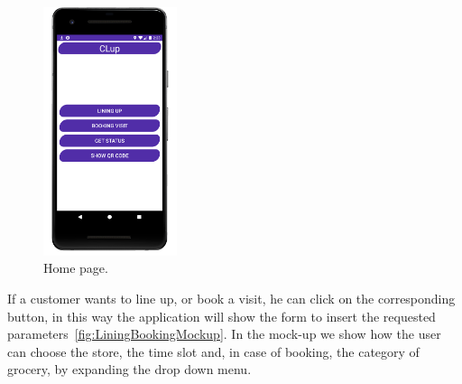 \begin{figure}[H]
	\centering
	\includegraphics[width=0.35\textwidth]{images/home.png}
	\caption{Home page.}
	\label{fig:HomeMockup}
\end{figure}

If a customer wants to line up, or book a visit, he can click on the corresponding button, in this way the application will show the form to insert the requested parameters~\ref{fig:LiningBookingMockup}.
In the mock-up we show how the user can choose the store, the time slot and, in case of booking, the category of grocery, by expanding the drop down menu.

